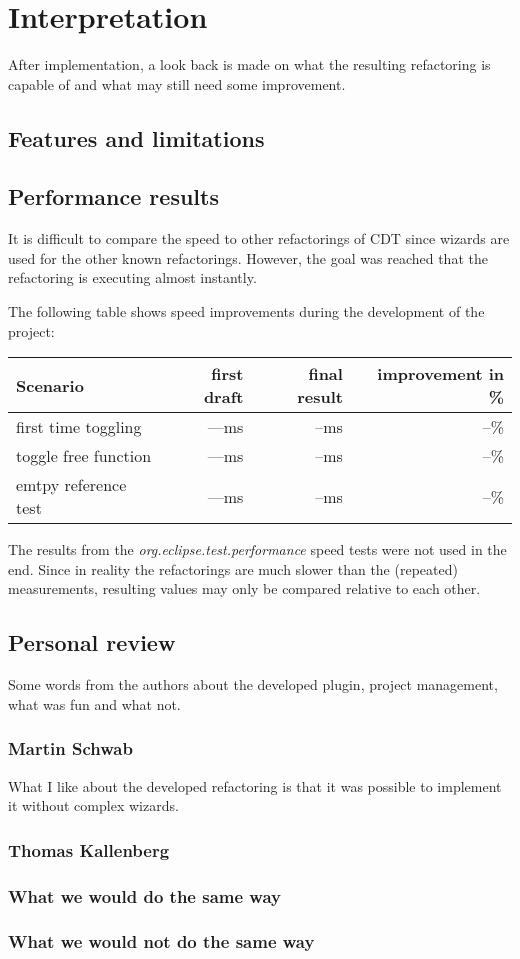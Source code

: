 \chapter{Interpretation}
\thispagestyle{fancy}

After implementation, a look back is made on what the resulting refactoring is 
capable of and what may still need some improvement.

\section{Features and limitations}



\section{Performance results}

It is difficult to compare the speed to other refactorings of CDT since wizards 
are used for the other known refactorings. However, the goal was reached that 
the refactoring is executing almost instantly.

The following table shows speed improvements during the development of the 
project:

\begin{tabular}[t]{l|rrr}
 Scenario   & first draft & final result & improvement in \% \\
 \hline
 first time toggling 	&  ---ms & --ms & --\% \\
 toggle free function	&  ---ms & --ms & --\% \\
 emtpy reference test	&  ---ms & --ms & --\% \\
\end{tabular}

The results from the \textit{org.eclipse.test.performance} speed tests were not 
used in the end. Since in reality the refactorings are much slower than the 
(repeated) measurements, resulting values may only be compared relative to each 
other.

\section{Personal review}

Some words from the authors about the developed plugin, project management, what 
was fun and what not.

\subsection{Martin Schwab}

What I like about the developed refactoring is that it was possible to implement 
it without complex wizards. 

\subsection{Thomas Kallenberg}


\subsection{What we would do the same way}


\subsection{What we would not do the same way}

